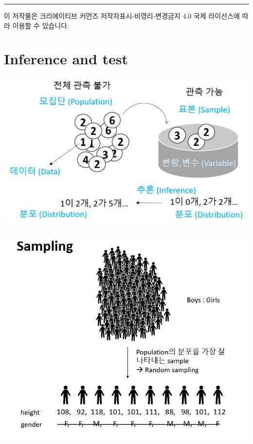 \documentclass[
]{book}
\begin{document}
\begin{center}\rule{0.5\linewidth}{0.5pt}\end{center}

이 저작물은 크리에이티브 커먼즈 저작자표시-비영리-변경금지 4.0 국제 라이선스에 따라 이용할 수 있습니다.

\hypertarget{inference-and-test}{%
\chapter{Inference and test}\label{inference-and-test}}

\includegraphics[width=6.25in,height=\textheight]{images/12/04-2.png}

\includegraphics[width=6.25in,height=\textheight]{images/12/06.png}
\end{document}
